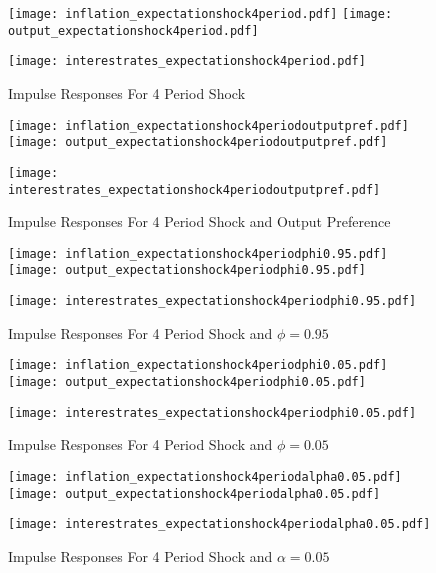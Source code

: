 \documentclass[12pt]{article}
\newcommand{\1}{\mathbbm 1}
\begin{document}
		
			\begin{figure}[H]
			\texttt{[image: inflation\_expectationshock4period.pdf]}
			\hfill
			\texttt{[image: output\_expectationshock4period.pdf]}
			\hfill
			\begin{Center}
				\texttt{[image: interestrates\_expectationshock4period.pdf]}
			\end{Center}
			\caption{Impulse Responses For 4 Period Shock}
		\end{figure}
	
	
	\begin{figure}[H]
		\texttt{[image: inflation\_expectationshock4periodoutputpref.pdf]}
		\hfill
		\texttt{[image: output\_expectationshock4periodoutputpref.pdf]}
		\hfill
		\begin{Center}
			\texttt{[image: interestrates\_expectationshock4periodoutputpref.pdf]}
		\end{Center}
		\caption{Impulse Responses For 4 Period Shock and Output Preference}
	\end{figure}


	\begin{figure}[H]
	\texttt{[image: inflation\_expectationshock4periodphi0.95.pdf]}
	\hfill
	\texttt{[image: output\_expectationshock4periodphi0.95.pdf]}
	\hfill
	\begin{Center}
		\texttt{[image: interestrates\_expectationshock4periodphi0.95.pdf]}
	\end{Center}
	\caption{Impulse Responses For 4 Period Shock and $\phi = 0.95$}
\end{figure}

\begin{figure}[H]
	\texttt{[image: inflation\_expectationshock4periodphi0.05.pdf]}
	\hfill
	\texttt{[image: output\_expectationshock4periodphi0.05.pdf]}
	\hfill
	\begin{Center}
		\texttt{[image: interestrates\_expectationshock4periodphi0.05.pdf]}
	\end{Center}
	\caption{Impulse Responses For 4 Period Shock and $\phi = 0.05$}
\end{figure}

\begin{figure}[H]
	\texttt{[image: inflation\_expectationshock4periodalpha0.05.pdf]}
	\hfill
	\texttt{[image: output\_expectationshock4periodalpha0.05.pdf]}
	\hfill
	\begin{Center}
		\texttt{[image: interestrates\_expectationshock4periodalpha0.05.pdf]}
	\end{Center}
	\caption{Impulse Responses For 4 Period Shock and $\alpha = 0.05$}
\end{figure}
\end{document}
